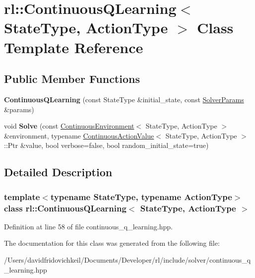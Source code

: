 \hypertarget{classrl_1_1_continuous_q_learning}{}\section{rl\+:\+:Continuous\+Q\+Learning$<$ State\+Type, Action\+Type $>$ Class Template Reference}
\label{classrl_1_1_continuous_q_learning}
\subsection*{Public Member Functions}
\begin{DoxyCompactItemize}
\item 
\hypertarget{classrl_1_1_continuous_q_learning_acad11cd674054dda55ccb9a325cc5c63}{}\label{classrl_1_1_continuous_q_learning_acad11cd674054dda55ccb9a325cc5c63} 
{\bfseries Continuous\+Q\+Learning} (const State\+Type \&initial\+\_\+state, const \hyperlink{structrl_1_1_solver_params}{Solver\+Params} \&params)
\item 
\hypertarget{classrl_1_1_continuous_q_learning_a47874620774784551b90a509190adcad}{}\label{classrl_1_1_continuous_q_learning_a47874620774784551b90a509190adcad} 
void {\bfseries Solve} (const \hyperlink{classrl_1_1_continuous_environment}{Continuous\+Environment}$<$ State\+Type, Action\+Type $>$ \&environment, typename \hyperlink{classrl_1_1_continuous_action_value}{Continuous\+Action\+Value}$<$ State\+Type, Action\+Type $>$\+::Ptr \&value, bool verbose=false, bool random\+\_\+initial\+\_\+state=true)
\end{DoxyCompactItemize}


\subsection{Detailed Description}
\subsubsection*{template$<$typename State\+Type, typename Action\+Type$>$\newline
class rl\+::\+Continuous\+Q\+Learning$<$ State\+Type, Action\+Type $>$}



Definition at line 58 of file continuous\+\_\+q\+\_\+learning.\+hpp.



The documentation for this class was generated from the following file\+:\begin{DoxyCompactItemize}
\item 
/\+Users/davidfridovichkeil/\+Documents/\+Developer/rl/include/solver/continuous\+\_\+q\+\_\+learning.\+hpp\end{DoxyCompactItemize}
